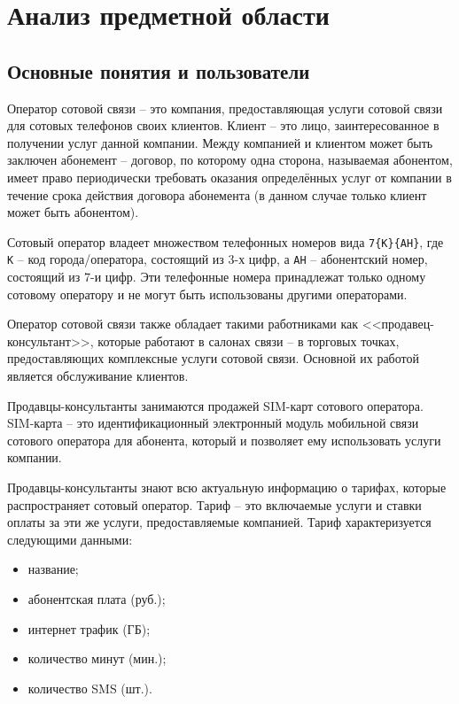 \section{Анализ предметной области}\label{sec:domain-analysis}


\subsection{Основные понятия и пользователи}


Оператор сотовой связи -- это компания, предоставляющая услуги сотовой связи для сотовых телефонов своих клиентов. Клиент -- это лицо, заинтересованное в получении услуг данной компании. Между компанией и клиентом может быть заключен абонемент -- договор, по которому одна сторона, называемая абонентом, имеет право периодически требовать оказания определённых услуг от компании в течение срока действия договора абонемента (в данном случае только клиент может быть абонентом).

Сотовый оператор владеет множеством телефонных номеров вида \texttt{7\{К\}\{АН\}}, где \texttt{К} -- код города/оператора, состоящий из 3-х цифр, а \texttt{АН} -- абонентский номер, состоящий из 7-и цифр. Эти телефонные номера принадлежат только одному сотовому оператору и не могут быть использованы другими операторами.

Оператор сотовой связи также обладает такими работниками как <<продавец-консультант>>, которые работают в салонах связи -- в торговых точках, предоставляющих комплексные услуги сотовой связи. Основной их работой является обслуживание клиентов.

Продавцы-консультанты занимаются продажей SIM-карт сотового оператора. SIM-карта -- это идентификационный электронный модуль мобильной связи сотового оператора для абонента, который и позволяет ему использовать услуги компании.

Продавцы-консультанты знают всю актуальную информацию о тарифах, которые распространяет сотовый оператор. Тариф -- это включаемые услуги и ставки оплаты за эти же услуги, предоставляемые компанией. Тариф характеризуется следующими данными:
\begin{itemize}
    \item название;
    \item абонентская плата (руб.);
    \item интернет трафик (ГБ);
    \item количество минут (мин.);
    \item количество SMS (шт.).
\end{itemize}

